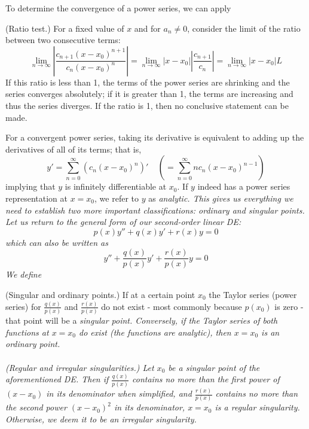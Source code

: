 \documentclass{article}
\begin{document}
To determine the convergence of a power series, we can apply
\begin{method}
    (Ratio test.) For a fixed value of $x$ and for $a_n\neq 0$, consider the limit of the ratio between two consecutive terms: 
    \begin{equation*}
        \lim_{n\to\infty} |\frac{c_{n+1}(x-x_0)^{n+1}}{c_{n}(x-x_0)^n}|=\lim_{n\to\infty} |x-x_0||\frac{c_{n+1}}{c_n}|=\lim_{n\to\infty}|x-x_0|L
    \end{equation*}
    If this ratio is less than 1, the terms of the power series are shrinking and the series converges absolutely; if it is greater than 1, the terms are increasing and thus the series diverges. If the ratio is 1, then no conclusive statement can be made.
\end{method}
For a convergent power series, taking its derivative is equivalent to adding up the derivatives of all of its terms; that is,
\begin{equation*}
    y'=\sum_{n=0}^{\infty} (c_n (x-x_0)^n)'\ \ \ \ \  (=\sum_{n=0}^{\infty} nc_n (x-x_0)^{n-1})
\end{equation*}
implying that $y$ is infinitely differentiable at $x_0$. If $y$ indeed has a power series representation at $x=x_0$, we refer to $y$ as \it analytic\normalfont . This gives us everything we need to establish two more important classifications: ordinary and singular points. Let us return to the general form of our second-order linear DE:
\begin{equation*}
    p(x)y''+q(x)y'+r(x)y=0
\end{equation*}
which can also be written as 
\begin{equation*}
    y''+\frac{q(x)}{p(x)}y'+\frac{r(x)}{p(x)}y=0
\end{equation*}
We define
\begin{definition}
    (Singular and ordinary points.) If at a certain point $x_0$ the Taylor series (power series) for $\frac{q(x)}{p(x)}$ and $\frac{r(x)}{p(x)}$ do not exist - most commonly because $p(x_0)$ is zero - that point will be a \it singular point\normalfont. Conversely, if the Taylor series of both functions at $x=x_0$ do exist (the functions are analytic), then $x=x_0$ is an ordinary point.
\\ \\
    (Regular and irregular singularities.) Let $x_0$ be a singular point of the aforementioned DE. Then if $\frac{q(x)}{p(x)}$ contains no more than the first power of $(x-x_0)$ in its denominator when simplified, and $\frac{r(x)}{p(x)}$ contains no more than the second power $(x-x_0)^2$ in its denominator, $x=x_0$ is a regular singularity. Otherwise, we deem it to be an irregular singularity.
\end{definition}
\end{document}
